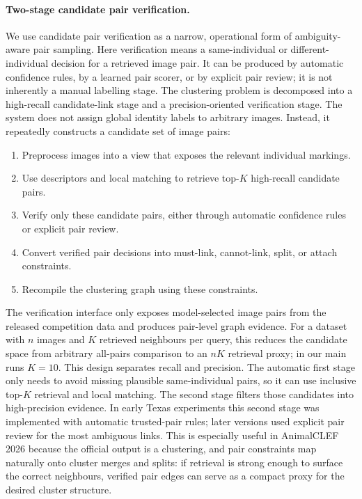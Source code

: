 \documentclass{ceurart}
\begin{document}
\paragraph{Two-stage candidate pair verification.}
We use candidate pair verification as a narrow, operational form of ambiguity-aware pair sampling. Here verification means a same-individual or different-individual decision for a retrieved image pair. It can be produced by automatic confidence rules, by a learned pair scorer, or by explicit pair review; it is not inherently a manual labelling stage. The clustering problem is decomposed into a high-recall candidate-link stage and a precision-oriented verification stage. The system does not assign global identity labels to arbitrary images. Instead, it repeatedly constructs a candidate set of image pairs:
\begin{enumerate}[leftmargin=*]
  \item Preprocess images into a view that exposes the relevant individual markings.
  \item Use descriptors and local matching to retrieve top-$K$ high-recall candidate pairs.
  \item Verify only these candidate pairs, either through automatic confidence rules or explicit pair review.
  \item Convert verified pair decisions into must-link, cannot-link, split, or attach constraints.
  \item Recompile the clustering graph using these constraints.
\end{enumerate}
The verification interface only exposes model-selected image pairs from the released competition data and produces pair-level graph evidence. For a dataset with $n$ images and $K$ retrieved neighbours per query, this reduces the candidate space from arbitrary all-pairs comparison to an $nK$ retrieval proxy; in our main runs $K=10$.
This design separates recall and precision. The automatic first stage only needs to avoid missing plausible same-individual pairs, so it can use inclusive top-$K$ retrieval and local matching. The second stage filters those candidates into high-precision evidence. In early Texas experiments this second stage was implemented with automatic trusted-pair rules; later versions used explicit pair review for the most ambiguous links. This is especially useful in AnimalCLEF 2026 because the official output is a clustering, and pair constraints map naturally onto cluster merges and splits: if retrieval is strong enough to surface the correct neighbours, verified pair edges can serve as a compact proxy for the desired cluster structure.
\end{document}
